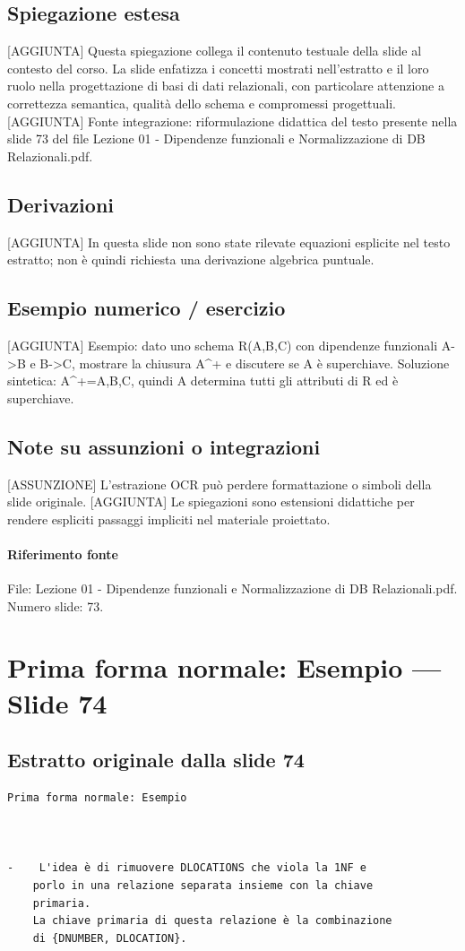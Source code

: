 \documentclass[11pt]{article}
\begin{document}
\subsection*{Spiegazione estesa}
[AGGIUNTA] Questa spiegazione collega il contenuto testuale della slide al contesto del corso. La slide enfatizza i concetti mostrati nell'estratto e il loro ruolo nella progettazione di basi di dati relazionali, con particolare attenzione a correttezza semantica, qualità dello schema e compromessi progettuali.
[AGGIUNTA] Fonte integrazione: riformulazione didattica del testo presente nella slide 73 del file Lezione 01 - Dipendenze funzionali e Normalizzazione di DB Relazionali.pdf.
\subsection*{Derivazioni}
[AGGIUNTA] In questa slide non sono state rilevate equazioni esplicite nel testo estratto; non è quindi richiesta una derivazione algebrica puntuale.
\subsection*{Esempio numerico / esercizio}
[AGGIUNTA] Esempio: dato uno schema R(A,B,C) con dipendenze funzionali A->B e B->C, mostrare la chiusura A^+ e discutere se A è superchiave. Soluzione sintetica: A^+={A,B,C}, quindi A determina tutti gli attributi di R ed è superchiave.
\subsection*{Note su assunzioni o integrazioni}
[ASSUNZIONE] L'estrazione OCR può perdere formattazione o simboli della slide originale.
[AGGIUNTA] Le spiegazioni sono estensioni didattiche per rendere espliciti passaggi impliciti nel materiale proiettato.
\paragraph{Riferimento fonte} File: Lezione 01 - Dipendenze funzionali e Normalizzazione di DB Relazionali.pdf. Numero slide: 73.
\section{Prima forma normale: Esempio --- Slide 74}
\subsection*{Estratto originale dalla slide 74}
\begin{lstlisting}
Prima forma normale: Esempio



-    L'idea è di rimuovere DLOCATIONS che viola la 1NF e
    porlo in una relazione separata insieme con la chiave
    primaria.
    La chiave primaria di questa relazione è la combinazione
    di {DNUMBER, DLOCATION}.
\end{lstlisting}
\end{document}
